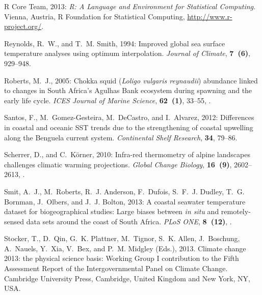 \documentclass{ametsoc}
\begin{document}
\begin{thebibliography}{23}

{R Core Team}, 2013: \textit{{R: A Language and Environment for Statistical
  Computing}}. Vienna, Austria, R Foundation for Statistical Computing,
  \urlprefix\url{http://www.r-project.org/}.

Reynolds, R.~W., and T.~M. Smith, 1994: {Improved global sea surface
  temperature analyses using optimum interpolation}. \textit{Journal of
  Climate}, \textbf{7~(6)}, 929--948.

Roberts, M.~J., 2005: {Chokka squid (\textit{Loligo vulgaris reynaudii}) abundance
  linked to changes in South Africa's Agulhas Bank ecosystem during spawning
  and the early life cycle}. \textit{ICES Journal of Marine Science},
  \textbf{62~(1)}, 33--55, .

Santos, F., M.~Gomez-Gesteira, M.~DeCastro, and I.~Alvarez, 2012: {Differences
  in coastal and oceanic SST trends due to the strengthening of coastal
  upwelling along the Benguela current system}. \textit{Continental Shelf
  Research}, \textbf{34}, 79--86.

Scherrer, D., and C.~K{\"{o}}rner, 2010: {Infra-red thermometry of alpine
  landscapes challenges climatic warming projections}. \textit{Global Change
  Biology}, \textbf{16~(9)}, 2602--2613,
  .

Smit, A.~J., M.~Roberts, R.~J. Anderson, F.~Dufois, S.~F.~J. Dudley, T.~G.
  Bornman, J.~Olbers, and J.~J. Bolton, 2013: {A coastal seawater temperature
  dataset for biogeographical studies: Large biases between \textit{in situ} and
  remotely-sensed data sets around the coast of South Africa}. \textit{PLoS
  ONE}, \textbf{8~(12)}, .

Stocker, T., D.~Qin, G.~K. Plattner, M.~Tignor, S.~K. Allen, J.~Boschung,
  A.~Nauels, Y.~Xia, V.~Bex, and P.~M. Midgley (Eds.), 2013. {Climate change
  2013: the physical science basis: Working Group I contribution to the Fifth
  Assessment Report of the Intergovernmental Panel on Climate Change}.
  Cambridge University Press, Cambridge, United Kingdom and New York, NY, USA. 


\end{thebibliography}
\end{document}
